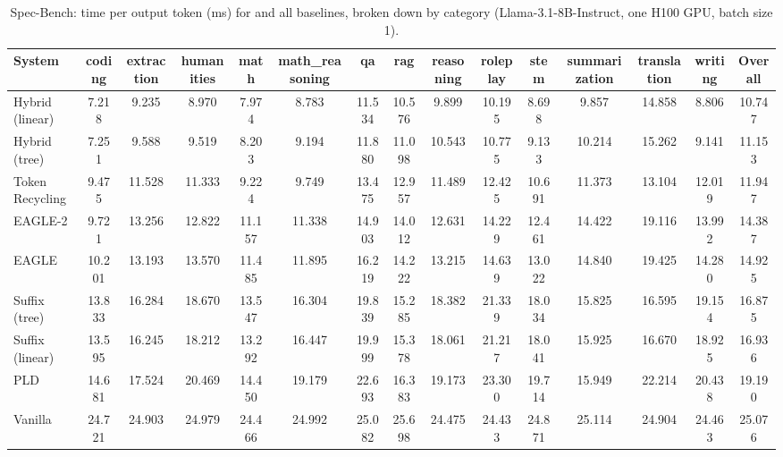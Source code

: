 \begin{table}[htbp]
\centering
\caption{Spec-Bench: time per output token (ms) for \SuffixDecoding and all baselines, broken down by category (Llama-3.1-8B-Instruct, one H100 GPU, batch size 1).}
\label{suffixdecoding:tab:spec-tpot}
\small
\begin{adjustbox}{width=\linewidth}
\begin{tabular}{lcccccccccccccc}
\toprule
\textbf{System} & coding & extraction & humanities & math & math\_reasoning & qa & rag & reasoning & roleplay & stem & summarization & translation & writing & \textbf{Overall} \\
\midrule
Hybrid (linear) & 7.218 & 9.235 & 8.970 & 7.974 & 8.783 & 11.534 & 10.576 & 9.899 & 10.195 & 8.698 & 9.857 & 14.858 & 8.806 & 10.747 \\
Hybrid (tree) & 7.251 & 9.588 & 9.519 & 8.203 & 9.194 & 11.880 & 11.098 & 10.543 & 10.775 & 9.133 & 10.214 & 15.262 & 9.141 & 11.153 \\
Token Recycling & 9.475 & 11.528 & 11.333 & 9.224 & 9.749 & 13.475 & 12.957 & 11.489 & 12.425 & 10.691 & 11.373 & 13.104 & 12.019 & 11.947 \\
EAGLE-2 & 9.721 & 13.256 & 12.822 & 11.157 & 11.338 & 14.903 & 14.012 & 12.631 & 14.229 & 12.461 & 14.422 & 19.116 & 13.992 & 14.387 \\
EAGLE & 10.201 & 13.193 & 13.570 & 11.485 & 11.895 & 16.219 & 14.222 & 13.215 & 14.639 & 13.022 & 14.840 & 19.425 & 14.280 & 14.925 \\
Suffix (tree) & 13.833 & 16.284 & 18.670 & 13.547 & 16.304 & 19.839 & 15.285 & 18.382 & 21.339 & 18.034 & 15.825 & 16.595 & 19.154 & 16.875 \\
Suffix (linear) & 13.595 & 16.245 & 18.212 & 13.292 & 16.447 & 19.999 & 15.378 & 18.061 & 21.217 & 18.041 & 15.925 & 16.670 & 18.925 & 16.936 \\
PLD & 14.681 & 17.524 & 20.469 & 14.450 & 19.179 & 22.693 & 16.383 & 19.173 & 23.300 & 19.714 & 15.949 & 22.214 & 20.438 & 19.190 \\
Vanilla & 24.721 & 24.903 & 24.979 & 24.466 & 24.992 & 25.082 & 25.698 & 24.475 & 24.433 & 24.871 & 25.114 & 24.904 & 24.463 & 25.076 \\
\bottomrule
\end{tabular}
\end{adjustbox}
\end{table}


